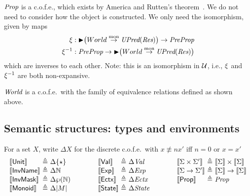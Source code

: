 $\textit{Prop}$ is a c.o.f.e., which exists by America and Rutten's theorem~\cite{America-Rutten:JCSS89}.
We do not need to consider how the object is constructed. 
We only need the isomorphism, given by maps
\begin{align*}
	\xi &: \mathord{\blacktriangleright} \bigl(World \stackrel{\textrm{mon}}{\rightarrow} \textit{UPred}(\textit{Res})\bigr) \to \textit{PreProp} \\
	\xi^{-1} &: \textit{PreProp} \to \mathord{\blacktriangleright} \bigl(World \stackrel{\textrm{mon}}{\rightarrow} \textit{UPred}(\textit{Res})\bigr)
\end{align*}
which are inverses to each other. 
Note: this is an isomorphism in $\cal U$, i.e., $\xi$ and
$\xi^{-1}$ are both non-expansive.

$\textit{World}$ is a c.o.f.e.\ with the family of equivalence
relations defined as shown above.

\subsection{Semantic structures: types and environments}

For a set $X$, write $\Delta X$ for the discrete c.o.f.e.\ with $x \nequiv{n}
x'$ iff $n = 0$ or $x = x'$
\[
\begin{array}[t]{@{}l@{\ }c@{\ }l@{}}
\Sem{\textsort{Unit}} &\eqdef& \Delta \{ \star \} \\
\Sem{\textsort{InvName}} &\eqdef& \Delta \mathbb{N}  \\
\Sem{\textsort{InvMask}} &\eqdef& \Delta \pset{\mathbb{N}} \\
\Sem{\textsort{Monoid}} &\eqdef& \Delta |\monoid|
\end{array}
\qquad\qquad
\begin{array}[t]{@{}l@{\ }c@{\ }l@{}}
\Sem{\textsort{Val}} &\eqdef& \Delta \textdom{Val} \\
\Sem{\textsort{Exp}} &\eqdef& \Delta \textdom{Exp} \\
\Sem{\textsort{Ectx}} &\eqdef& \Delta \textdom{Ectx} \\
\Sem{\textsort{State}} &\eqdef& \Delta \textdom{State} \\
\end{array}
\qquad\qquad
\begin{array}[t]{@{}l@{\ }c@{\ }l@{}}
\Sem{\sort \times \sort'} &\eqdef& \Sem{\sort} \times \Sem{\sort} \\
\Sem{\sort \to \sort'} &\eqdef& \Sem{\sort} \to \Sem{\sort} \\
\Sem{\Prop} &\eqdef& \textdom{Prop} \\
\end{array}
\]

